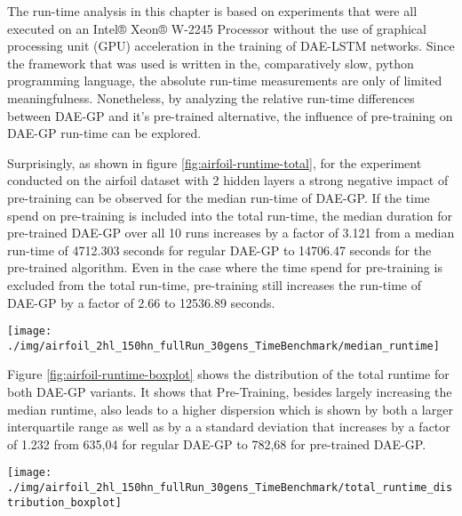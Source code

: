\documentclass[
  11pt,
]{article}
\let\origfigure\figure
\let\endorigfigure\endfigure
\renewenvironment{figure}[1][2] {
    \expandafter\origfigure\expandafter[H]
} {
    \endorigfigure
}
\begin{document}
The run-time analysis in this chapter is based on experiments that were all executed on an Intel® Xeon® W-2245 Processor without the use of graphical processing unit (GPU) acceleration in the training of DAE-LSTM networks.
Since the framework that was used is written in the, comparatively slow, python programming language, the absolute run-time measurements are only of limited meaningfulness.
Nonetheless, by analyzing the relative run-time differences between DAE-GP and it's pre-trained alternative, the influence of pre-training on DAE-GP run-time can be explored.

Surprisingly, as shown in figure \ref{fig:airfoil-runtime-total}, for the experiment conducted on the airfoil dataset with 2 hidden layers a strong negative impact of pre-training can be observed for the median run-time of DAE-GP.
If the time spend on pre-training is included into the total run-time, the median duration for pre-trained DAE-GP over all 10 runs increases by a factor of 3.121 from a median run-time of 4712.303 seconds for regular DAE-GP to 14706.47 seconds for the pre-trained algorithm.
Even in the case where the time spend for pre-training is excluded from the total run-time, pre-training still increases the run-time of DAE-GP by a factor of 2.66 to 12536.89 seconds.

\begin{figure}[c]

{\centering \texttt{[image: ./img/airfoil\_2hl\_150hn\_fullRun\_30gens\_TimeBenchmark/median\_runtime]} 

}

\caption{Median Runtime - Airfoil}\label{fig:airfoil-runtime-total}
\end{figure}

Figure \ref{fig:airfoil-runtime-boxplot} shows the distribution of the total runtime for both DAE-GP variants.
It shows that Pre-Training, besides largely increasing the median runtime, also leads to a higher dispersion which is shown by both a larger interquartile range as well as by a a standard deviation that increases by a factor of 1.232 from 635,04 for regular DAE-GP to 782,68 for pre-trained DAE-GP.

\begin{figure}[c]

{\centering \texttt{[image: ./img/airfoil\_2hl\_150hn\_fullRun\_30gens\_TimeBenchmark/total\_runtime\_distribution\_boxplot]} 

}

\caption{Total Runtime Boxplot - Airfoil}\label{fig:airfoil-runtime-boxplot}
\end{figure}
\end{document}
